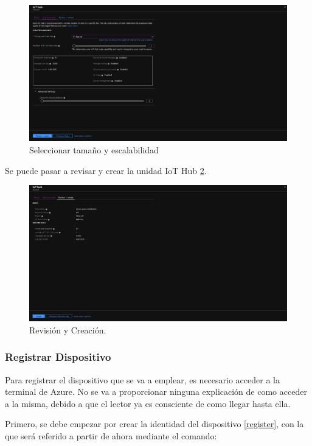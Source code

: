 \documentclass[10pt]{article}
\begin{document}
\begin{figure}[h!]
 \includegraphics[width=\linewidth]{./IoT/MicrosoftAzure/1-2_create_resource.png}
 \caption{Seleccionar tamaño y escalabilidad}
 \label{sizescale}
\end{figure}

Se puede pasar a revisar y crear la unidad IoT Hub \hyperref[review]{\ref{review}}.

\begin{figure}[h!]
 \includegraphics[width=\linewidth]{./IoT/MicrosoftAzure/1-3_create_resource.png}
 \caption{Revisión y Creación.}
 \label{review}
\end{figure}

\subsubsection{Registrar Dispositivo}

Para registrar el dispositivo que se va a emplear, es necesario acceder a la
terminal de Azure. No se va a proporcionar ninguna explicación de como acceder a
la misma, debido a que el lector ya es consciente de como llegar hasta ella.

Primero, se debe empezar por crear la identidad del dispositivo 
\hyperref[register]{\ref{register}}, con la que será referido a partir de ahora 
mediante el comando:
\end{document}
